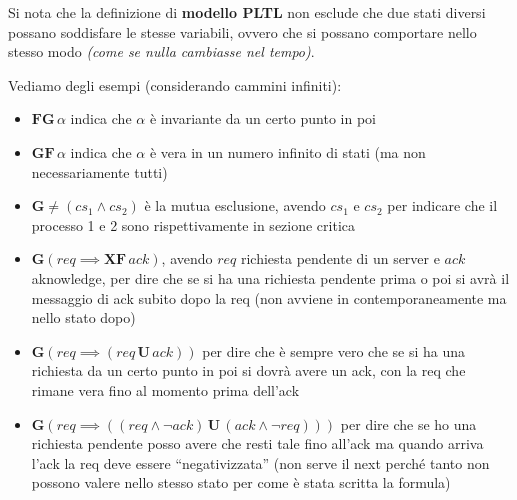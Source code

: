 Si nota che la definizione di \textbf{modello PLTL} non esclude che due stati
diversi possano soddisfare le stesse variabili, ovvero che si possano comportare
nello stesso modo \textit{(come se nulla cambiasse nel tempo)}.
\begin{esempio}
  Vediamo degli esempi (considerando cammini infiniti):
  \begin{itemize}
    \item $\mathbf{FG}\,\alpha$ indica che $\alpha$ è invariante da un certo
    punto in poi
    \item $\mathbf{GF}\,\alpha$ indica che $\alpha$ è vera in un numero infinito
    di stati (ma non necessariamente tutti)
    \item $\mathbf{G}\neq (cs_1\land cs_2)$ è la mutua esclusione, avendo $cs_1$
    e $cs_2$ per indicare che il processo 1 e 2 sono rispettivamente in sezione
    critica 
    \item $\mathbf{G}(req\implies\mathbf{XF}\, ack)$, avendo $req$ richiesta
    pendente di un server e $ack$ aknowledge, per dire che se si ha una
    richiesta pendente prima o poi si avrà il messaggio di ack subito dopo la
    req (non avviene in contemporaneamente ma nello stato dopo)
    \item $\mathbf{G}(req\implies(req\,\mathbf{U}\, ack))$ per dire che è sempre
    vero che se si ha una richiesta da un certo punto in poi si dovrà avere un
    ack, con la req che rimane vera fino al momento prima dell'ack
    \item $\mathbf{G}(req\implies((req\land \neg ack)\,\mathbf{U}\,(ack\land\neg
    req)))$ per dire che se ho una richiesta pendente posso avere che resti tale
    fino all'ack ma quando arriva l'ack la req deve essere ``negativizzata''
    (non serve il next perché tanto non possono valere nello stesso stato per
    come è stata scritta la formula)
  \end{itemize}
\end{esempio}
